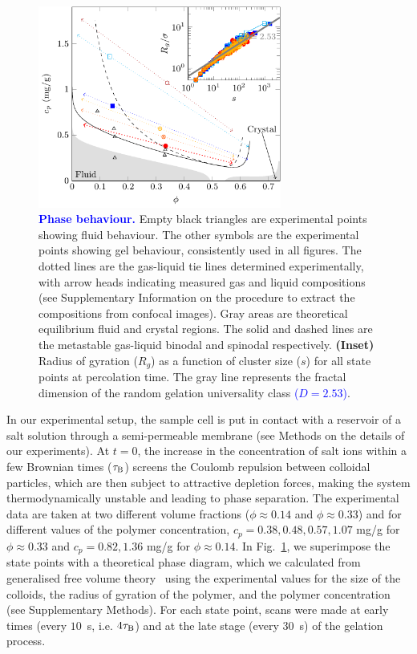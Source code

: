\documentclass[preprint,amsmath,amssymb,superscriptaddress]{revtex4-1}
\begin{document}
\begin{figure}[h]
 \includegraphics[width=8cm]{network_formation.pdf}
 \caption{\textcolor{blue}{{\bf Phase behaviour.}} 
Empty black triangles are experimental points showing fluid behaviour. The other symbols are the experimental points showing gel behaviour, consistently used in all figures. The dotted lines are the gas-liquid tie lines determined experimentally, with arrow heads indicating measured gas and liquid compositions (see Supplementary Information on the procedure to extract the compositions from confocal images).  Gray areas are theoretical equilibrium fluid and crystal regions. The solid and dashed lines are the metastable gas-liquid binodal and spinodal respectively.
\textbf{(Inset)} Radius of gyration ($R_g$) as a function of cluster size ($s$) for all state points at percolation time. The gray line represents the fractal dimension of the random gelation universality class \textcolor{blue}{($D=2.53$)}.
 }
 \label{fig:network_formation}
\end{figure}


In our experimental setup, the sample cell is put in contact with a reservoir of a salt solution through a semi-permeable membrane (see Methods 
on the details of our experiments).
At $t=0$, the increase in the concentration of salt ions within a few Brownian times ($\tau_{\rm B}$) screens the Coulomb repulsion between colloidal particles,
which are then subject to attractive depletion forces, making the system thermodynamically unstable and leading to phase separation. 
The experimental data are taken at two different volume fractions ($\phi\approx 0.14$ and $\phi\approx 0.33$) and for different values
of the polymer concentration, $c_p=0.38,0.48,0.57,1.07$ mg/g for $\phi\approx 0.33$ and $c_p=0.82,1.36$ mg/g for $\phi\approx 0.14$.
In Fig.~\ref{fig:network_formation}, we superimpose the state points with a theoretical phase diagram, which we calculated from generalised free volume theory~\cite{Fleer2008} using the experimental values for the size of the colloids, the radius of gyration of the polymer, and the polymer concentration (see Supplementary Methods).
For each state point, scans were made at early times (every $10$~s, i.e. $4\tau_{\rm B}$) and at the late stage (every $30$~s) of the gelation process. 
\end{document}
